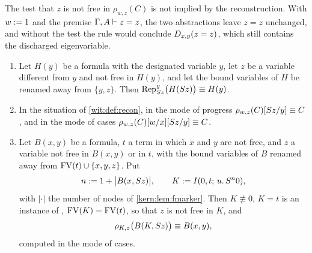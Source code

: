 The test that $z$ is not free in $\rho_{w,z}(C)$ is not implied by the
reconstruction.  With $w\mathrel{:=} 1$ and the premise $\Gamma,A\vdash z=z$, the
two abstractions leave $z=z$ unchanged, and without the test the rule would
conclude $D_{x,y}(z=z)$, which still contains the discharged eigenvariable.

\begin{lemma}
\label{wit:lem:recon-syntax}
\leavevmode
\begin{enumerate}[label=\textup{(\roman*)}]
\item Let $H(y)$ be a formula with the designated variable $y$, let $z$ be a
 variable different from $y$ and not free in $H(y)$, and let the bound
 variables of $H$ be renamed away from $\{y,z\}$.  Then
 $\operatorname{Rep}_{S z}^{y}\bigl(H(S z)\bigr)\equiv H(y)$.
\item In the situation of \cref{wit:def:recon}, in the mode of progress
 $\rho_{w,z}(C)[S z/y]\equiv C$, and in the mode of cases
 $\rho_{w,z}(C)[w/x][S z/y]\equiv C$.
\item Let $B(x,y)$ be a formula, $t$ a term in which $x$ and $y$ are not
 free, and $z$ a variable not free in $B(x,y)$ or in $t$, with the bound
 variables of $B$ renamed away from $\operatorname{FV}(t)\cup\{x,y,z\}$.  Put
 \[
  n\mathrel{:=} 1+\bigl|B(x,S z)\bigr|,\qquad
  K\mathrel{:=}I(0,t;\,u.\,S^{n}0),
 \]
 with $|\cdot|$ the number of nodes of \cref{kern:lem:fmarker}.  Then
 $K\not\equiv 0$, $K=t$ is an instance of ,
 $\operatorname{FV}(K)=\operatorname{FV}(t)$, so that $z$ is not free in $K$, and
 \[
  \rho_{K,z}\bigl(B(K,S z)\bigr)\equiv B(x,y),
 \]
 computed in the mode of cases.
\end{enumerate}
\end{lemma}

